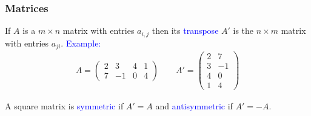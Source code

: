 \documentclass[11pt,aspectratio=169]{beamer}
\begin{document}
\begin{frame}
\frametitle{Matrices}
\begin{small}

If $A$ is a $m \times n$ matrix with entries $a_{i,j}$ then its \textcolor{blue}{transpose} $A'$ is the $n\times m$ matrix with entries $a_{ji}$.
\vskip 12pt
\textcolor{blue}{Example:}
\begin{align*}A=\begin{pmatrix}2& 3 & 4 & 1\\
7 & -1 & 0 & 4
\end{pmatrix} \qquad 
A'=\begin{pmatrix}2& 7\\
3 & -1 \\
4 & 0 \\
1& 4
\end{pmatrix}
\end{align*}

A square matrix is \textcolor{blue}{symmetric} if $A'=A$ and \textcolor{blue}{antisymmetric} if $A'=-A$. 


\end{small}
\end{frame}
\end{document}

